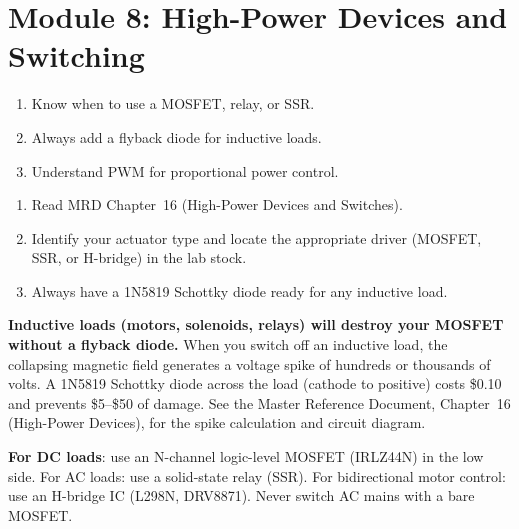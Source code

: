 \documentclass[11pt,letterpaper]{article}
\begin{document}
\section{Module 8: High-Power Devices and Switching}

\begin{priorities}
\begin{enumerate}[leftmargin=*, itemsep=1pt, topsep=0pt]
    \item Know when to use a MOSFET, relay, or SSR.
    \item Always add a flyback diode for inductive loads.
    \item Understand PWM for proportional power control.
\end{enumerate}
\end{priorities}

\begin{tcolorbox}[colback=minesblue!3, colframe=minesblue!40, boxrule=0.5pt, arc=2pt, left=6pt, right=6pt, top=3pt, bottom=3pt, fonttitle=\small\bfseries\color{minesblue}, title={Before You Start: Module 8}]
\small
\begin{enumerate}[nosep,leftmargin=*]
\item Read MRD Chapter~16 (High-Power Devices and Switches).
\item Identify your actuator type and locate the appropriate driver (MOSFET, SSR, or H-bridge) in the lab stock.
\item Always have a 1N5819 Schottky diode ready for any inductive load.
\end{enumerate}
\end{tcolorbox}

\begin{warnbox}
\textbf{Inductive loads (motors, solenoids, relays) will destroy your MOSFET without a flyback diode.} When you switch off an inductive load, the collapsing magnetic field generates a voltage spike of hundreds or thousands of volts. A 1N5819 Schottky diode across the load (cathode to positive) costs \$0.10 and prevents \$5--\$50 of damage. See the Master Reference Document, Chapter~16 (High-Power Devices), for the spike calculation and circuit diagram.
\end{warnbox}

\begin{tipbox}
\textbf{For DC loads}: use an N-channel logic-level MOSFET (IRLZ44N) in the low side. For AC loads: use a solid-state relay (SSR). For bidirectional motor control: use an H-bridge IC (L298N, DRV8871). Never switch AC mains with a bare MOSFET.
\end{tipbox}
\end{document}

